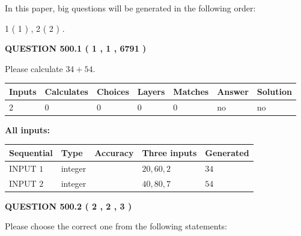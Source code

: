 \documentclass[12pt]{article}
\begin{document}
\vspace{0.2in}
   
In this paper, big questions will be generated in the following order: 
   
   
   1 ( 1 )
 ,
   2 ( 2 )
 .
  
\vspace{0.2in}
  
{\textbf{\Large{QUESTION
500.1 
 ( 1 , 1 , 6791 )
}}}
  
  
 
Please calculate $ %
34 +  %
54 $.
 
 
   
   
   
   
\noindent\begin{tabular}{|l|l|l|l|l|l|l|}
 \hline
Inputs & Calculates & Choices & Layers & Matches & Answer & Solution \\ \hline
 2  & 
 0  & 
 0
  & 
 0  & 
 0  & 
  no & 
  no 
  \\ \hline
 \end{tabular}
   
   
   
   
\noindent{}
   
   
   
   
\noindent\vspace{0.1in}\hspace{-0.08in} {\textbf{\Large{All inputs: }}}
   
   
  
  
\noindent\begin{tabular}{|l|l|l|l|l|}
\hline
 Sequential & Type & Accuracy & Three inputs & Generated \\ 
\hline
 
 
  INPUT $  1 $ & integer &  & $
 20
 , 
 60
 , 
 2
 $ & $ 34 $ 
 \\  \hline  
 
 
  INPUT $  2 $ & integer &  & $
 40
 , 
 80
 , 
 7
 $ & $ 54 $ 
 \\  \hline  
 \end{tabular}
   
   
  
\vspace{0.2in}
  
{\textbf{\Large{QUESTION
500.2 
 ( 2 , 2 , 3 )
}}}
  
  
Please choose the correct one from the following statements:
 
\end{document}
